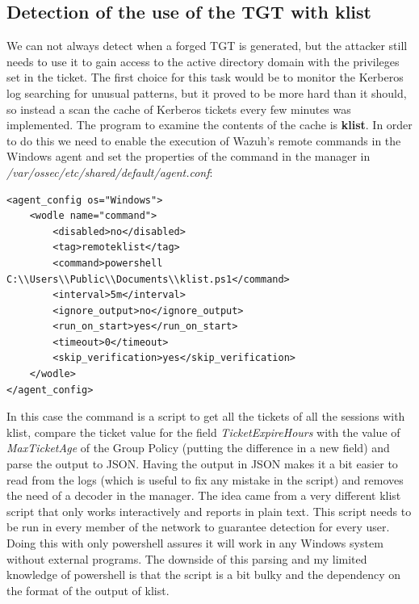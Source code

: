 \subsection{Detection of the use of the TGT with klist} \label{klist_detection}
We can not always detect when a forged TGT is generated, but the attacker still needs to use it to gain access to the active directory domain with the privileges set in the ticket. The first choice for this task would be to monitor the Kerberos log searching for unusual patterns, but it proved to be more hard than it should, so instead a scan the cache of Kerberos tickets every few minutes was implemented.
\linej
The program to examine the contents of the cache is \textbf{klist}.
\linej
\linej
In order to do this we need to enable the execution of Wazuh's remote commands in the Windows agent and set the properties of the command in the manager in \textit{/var/ossec/etc/shared/default/agent.conf}\cite{wazuh_remote_command}:
\linej
\begin{lstlisting}[style=xml]
<agent_config os="Windows">
	<wodle name="command">
		<disabled>no</disabled>
		<tag>remoteklist</tag>
		<command>powershell C:\\Users\\Public\\Documents\\klist.ps1</command>
		<interval>5m</interval>
		<ignore_output>no</ignore_output>
		<run_on_start>yes</run_on_start>
		<timeout>0</timeout>
		<skip_verification>yes</skip_verification>
	</wodle>
</agent_config>
\end{lstlisting}
\linej
In this case the command is a script to get all the tickets of all the sessions with klist, compare the ticket value for the field \textit{TicketExpireHours} with the value of \textit{MaxTicketAge} of the Group Policy (putting the difference in a new field) and parse the output to JSON. Having the output in JSON makes it a bit easier to read from the logs (which is useful to fix any mistake in the script) and removes the need of a decoder in the manager.
The idea came from a very different klist script that only works interactively and reports in plain text\cite{klist_script_idea}.
\linej
This script needs to be run in every member of the network to guarantee detection for every user.
\linej
Doing this with only powershell assures it will work in any Windows system without external programs. The downside of this parsing and my limited knowledge of powershell is that the script is a bit bulky and the dependency on the format of the output of klist.
